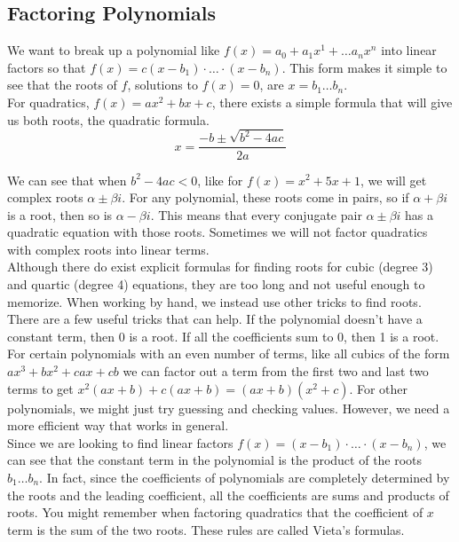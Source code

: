 \subsection{Factoring Polynomials}
\noindent
We want to break up a polynomial like $f(x) = a_0 + a_1x^1 + \ldots a_nx^n$ into linear factors so that $f(x) = c(x-b_1)\cdot \ldots \cdot(x - b_n)$. This form makes it simple to see that the roots of $f$, solutions to $f(x) = 0$, are $x = b_1 \ldots b_n$.\\

\noindent
For quadratics, $f(x) = ax^2 + bx + c$, there exists a simple formula that will give us both roots, the quadratic formula.
\begin{equation*}
	x = \frac{-b \pm \sqrt{b^2-4ac}}{2a}
\end{equation*}

\noindent
We can see that when $b^2 - 4ac < 0$, like for $f(x) = x^2 + 5x + 1$, we will get complex roots $\alpha \pm \beta i$. For any polynomial, these roots come in pairs, so if $\alpha + \beta i$ is a root, then so is $\alpha - \beta i$. This means that every conjugate pair $\alpha \pm \beta i$ has a quadratic equation with those roots. Sometimes we will not factor quadratics with complex roots into linear terms.\\

\noindent
Although there do exist explicit formulas for finding roots for cubic (degree 3) and quartic (degree 4) equations, they are too long and not useful enough to memorize. When working by hand, we instead use other tricks to find roots.\\

\noindent
There are a few useful tricks that can help. If the polynomial doesn't have a constant term, then 0 is a root. If all the coefficients sum to 0, then 1 is a root. For certain polynomials with an even number of terms, like all cubics of the form $ax^3 + bx^2 + cax + cb$ we can factor out a term from the first two and last two terms to get $x^2(ax+b)+c(ax+b) = (ax+b)(x^2+c)$. For other polynomials, we might just try guessing and checking values. However, we need a more efficient way that works in general.\\

\noindent
Since we are looking to find linear factors $f(x) = (x-b_1)\cdot \ldots \cdot(x-b_n)$, we can see that the constant term in the polynomial is the product of the roots $b_1 \ldots b_n$. In fact, since the coefficients of polynomials are completely determined by the roots and the leading coefficient, all the coefficients are sums and products of roots. You might remember when factoring quadratics that the coefficient of $x$ term is the sum of the two roots. These rules are called Vieta's formulas.\\


